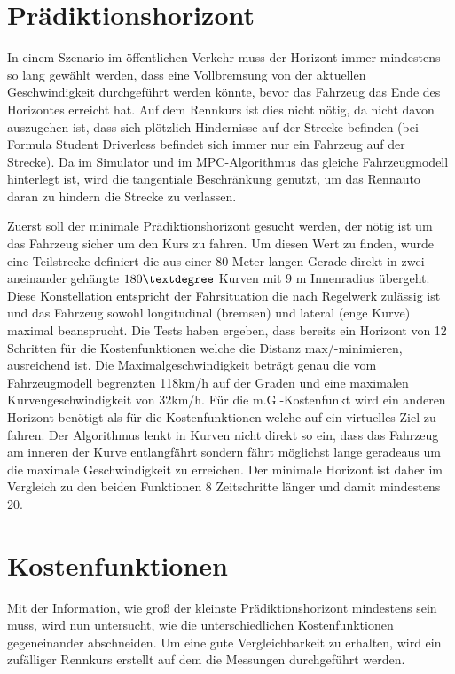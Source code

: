 \documentclass{like}
\begin{document}
\section{Prädiktionshorizont} 
In einem Szenario im öffentlichen Verkehr muss der Horizont immer mindestens so lang gewählt werden, dass eine Vollbremsung von der aktuellen Geschwindigkeit durchgeführt werden könnte, bevor das Fahrzeug das Ende des Horizontes erreicht hat. Auf dem Rennkurs ist dies nicht nötig, da nicht davon auszugehen ist, dass sich plötzlich Hindernisse auf der Strecke befinden (bei Formula Student Driverless befindet sich immer nur ein Fahrzeug auf der Strecke). Da im Simulator und im \ac{MPC}-Algorithmus das gleiche Fahrzeugmodell hinterlegt ist, wird die tangentiale Beschränkung genutzt, um das Rennauto daran zu hindern die Strecke zu verlassen.

Zuerst soll der minimale Prädiktionshorizont gesucht werden, der nötig ist um das Fahrzeug sicher um den Kurs zu fahren. Um diesen Wert zu finden, wurde eine Teilstrecke definiert die aus einer 80 Meter langen Gerade direkt in zwei aneinander gehängte $180\textdegree$ Kurven mit 9 m Innenradius übergeht. Diese Konstellation entspricht der Fahrsituation die nach Regelwerk zulässig ist und das Fahrzeug sowohl longitudinal (bremsen) und lateral (enge Kurve) maximal beansprucht. Die Tests haben ergeben, dass bereits ein Horizont von 12 Schritten für die Kostenfunktionen welche die Distanz max/-minimieren, ausreichend ist. Die Maximalgeschwindigkeit beträgt genau die vom Fahrzeugmodell begrenzten 118km/h auf der Graden und eine maximalen Kurvengeschwindigkeit von 32km/h. 
Für die \ac{m.G.}-Kostenfunkt wird ein anderen Horizont benötigt als für die Kostenfunktionen welche auf ein virtuelles Ziel zu fahren. Der Algorithmus lenkt in Kurven nicht direkt so ein, dass das Fahrzeug am inneren der Kurve entlangfährt sondern fährt möglichst lange geradeaus um die maximale Geschwindigkeit zu erreichen. Der minimale Horizont ist daher im Vergleich zu den beiden Funktionen 8 Zeitschritte länger und damit mindestens 20.


\section{Kostenfunktionen}
Mit der Information, wie groß der kleinste Prädiktionshorizont mindestens sein muss, wird nun untersucht, wie die unterschiedlichen Kostenfunktionen gegeneinander abschneiden. Um eine gute Vergleichbarkeit zu erhalten, wird ein zufälliger Rennkurs erstellt auf dem die Messungen durchgeführt werden. 
\end{document}
